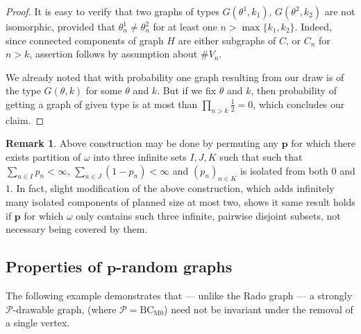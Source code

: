 \documentclass{amsart}
\theoremstyle{plain}
\theoremstyle{definition}
\newtheorem{rem}[theorem]{Remark}
\theoremstyle{remark}
\numberwithin{equation}{section}
\newcommand{\on}{\operatorname}
\newcommand{\PP}{\mathcal{P}}
\begin{document}
\begin{proof}
    
    
   It is easy to verify that two graphs of types $G(\theta^1,k_1)$, $G(\theta^2,k_2)$ are not isomorphic, provided that $\theta^1_n\neq\theta^2_n$ for at least one $n>\max\{k_1,k_2\}$. Indeed, since connected components of graph $H$ are either subgraphs of $C$, or $C_n$ for $n>k$, assertion follows by assumption about $\#V_n$.

    We already noted that with probability one graph resulting from our draw is of the type $G(\theta, k)$ for some $\theta$ and $k$. But if we fix $\theta$ and $k$, then probability of getting a graph of given type is at most than $\prod\limits_{n>k} \frac12=0$, which concludes our claim.
    \end{proof}
\begin{rem}
    Above construction may be done by permuting any $\textbf{p}$ for which there exists partition of $\omega$ into three infinite sets $I,J,K$ such that such that $\sum\limits_{n\in I}p_{n}<\infty$, $\sum\limits_{n\in J} \left( 1- p_{n}\right)<\infty$ and $(p_{n})_{n\in K}$ is isolated from both $0$ and $1$. In fact, slight modification of the above construction, which adds infinitely many isolated components of planned size at most two, shows it same result holds if $\textbf{p}$ for which $\omega$ only contains such three infinite, pairwise disjoint subsets, not necessary being covered by them.
\end{rem}

\subsection{Properties of $\textbf{p}$-random graphs
}


The following example demonstrates that — unlike the Rado graph — a strongly \(\PP\)-drawable graph, (where $\PP=\on{BC_{M0}}$) need not be invariant under the removal of a single vertex.
\end{document}
